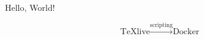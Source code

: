 \documentclass{article}
\begin{document}
    Hello, World!

    \[ \text{TeXlive} \xrightarrow{\text{scripting}} \text{Docker} \]
\end{document}
